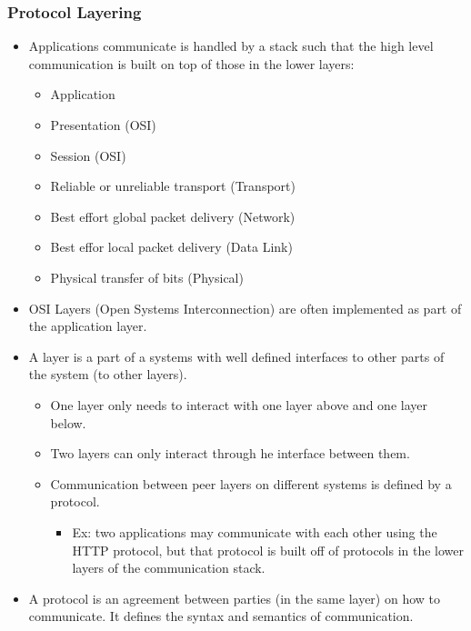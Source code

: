 \hypertarget{protocol-layering}{%
\subsubsection{Protocol Layering}\label{protocol-layering}}

\begin{itemize}
\tightlist
\item
  Applications communicate is handled by a stack such that the high
  level communication is built on top of those in the lower layers:

  \begin{itemize}
  \tightlist
  \item
    Application
  \item
    Presentation (OSI)
  \item
    Session (OSI)
  \item
    Reliable or unreliable transport (Transport)
  \item
    Best effort global packet delivery (Network)
  \item
    Best effor local packet delivery (Data Link)
  \item
    Physical transfer of bits (Physical)
  \end{itemize}
\item
  OSI Layers (Open Systems Interconnection) are often implemented as
  part of the application layer.
\item
  A layer is a part of a systems with well defined interfaces to other
  parts of the system (to other layers).

  \begin{itemize}
  \tightlist
  \item
    One layer only needs to interact with one layer above and one layer
    below.
  \item
    Two layers can only interact through he interface between them.
  \item
    Communication between peer layers on different systems is defined by
    a protocol.

    \begin{itemize}
    \tightlist
    \item
      Ex: two applications may communicate with each other using the
      HTTP protocol, but that protocol is built off of protocols in the
      lower layers of the communication stack.
    \end{itemize}
  \end{itemize}
\item
  A protocol is an agreement between parties (in the same layer) on how
  to communicate. It defines the syntax and semantics of communication.
\end{itemize}

